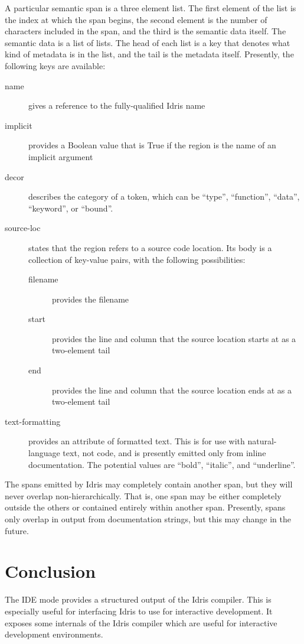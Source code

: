 \documentclass{article}
\begin{document}
A particular semantic span is a three element list.
The first element of the list is the index at which the span begins, the second element is the number of characters included in the span, and the third is the semantic data itself.
The semantic data is a list of lists.
The head of each list is a key that denotes what kind of metadata is in the list, and the tail is the metadata itself.
Presently, the following keys are available:
\begin{description}
\item[name] gives a reference to the fully-qualified Idris name
\item[implicit] provides a Boolean value that is True if the region is the name of an implicit argument
\item[decor] describes the category of a token, which can be ``type'', ``function'', ``data'', ``keyword'', or ``bound''.
\item[source-loc] states that the region refers to a source code location. Its body is a collection of key-value pairs, with the following possibilities:
  \begin{description}
  \item[filename] provides the filename
  \item[start] provides the line and column that the source location starts at as a two-element tail
  \item[end]  provides the line and column that the source location ends at as a two-element tail
  \end{description}
\item[text-formatting] provides an attribute of formatted text. This is for use with natural-language text, not code, and is presently emitted only from inline documentation. The potential values are ``bold'', ``italic'', and ``underline''.

\end{description}

The spans emitted by Idris may completely contain another span, but they will never overlap non-hierarchically. That is, one span may be either completely outside the others or contained entirely within another span.
Presently, spans only overlap in output from documentation strings, but this may change in the future.

\section{Conclusion}
The IDE mode provides a structured output of the Idris compiler.
This is especially useful for interfacing Idris to use for interactive development.
It exposes some internals of the Idris compiler which are useful for interactive development environments.
\end{document}
